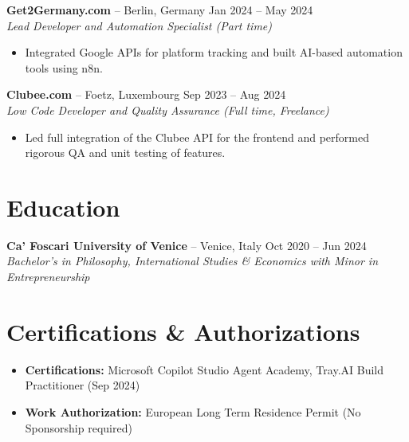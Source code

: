 \documentclass[10pt, a4paper]{article}
\begin{document}
\noindent \textbf{Get2Germany.com} -- Berlin, Germany \hfill Jan 2024 -- May 2024 \\
\textit{Lead Developer and Automation Specialist (Part time)}
\begin{itemize}[leftmargin=0.15in, label={--}]
    \item Integrated Google APIs for platform tracking and built AI-based automation tools using n8n.
\end{itemize}

\noindent \textbf{Clubee.com} -- Foetz, Luxembourg \hfill Sep 2023 -- Aug 2024 \\
\textit{Low Code Developer and Quality Assurance (Full time, Freelance)}
\begin{itemize}[leftmargin=0.15in, label={--}]
    \item Led full integration of the Clubee API for the frontend and performed rigorous QA and unit testing of features.
\end{itemize}

\section*{Education}
\noindent \textbf{Ca' Foscari University of Venice} -- Venice, Italy \hfill Oct 2020 -- Jun 2024 \\
\textit{Bachelor's in Philosophy, International Studies \& Economics with Minor in Entrepreneurship}

\section*{Certifications \& Authorizations}
\begin{itemize}[leftmargin=0.15in, label={--}]
    \item \textbf{Certifications:} Microsoft Copilot Studio Agent Academy, Tray.AI Build Practitioner (Sep 2024)
    \item \textbf{Work Authorization:} European Long Term Residence Permit (No Sponsorship required)
\end{itemize}
\end{document}
